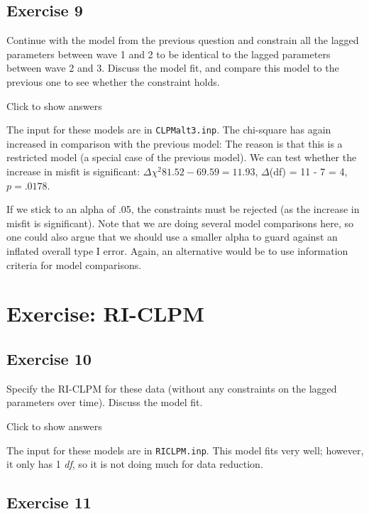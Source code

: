 \documentclass[
]{book}
\begin{document}
\hypertarget{exercise-9}{%
\subsection{Exercise 9}\label{exercise-9}}

Continue with the model from the previous question and constrain all the lagged parameters between wave 1 and 2 to be identical to the lagged parameters between wave 2 and 3. Discuss the model fit, and compare this model to the previous one to see whether the constraint holds.

Click to show answers

The input for these models are in \texttt{CLPMalt3.inp}. The chi-square has again increased in comparison with the previous model: The reason is that this is a restricted model (a special case of the previous model). We can test whether the increase in misfit is significant: \(\Delta\chi^{2} 81.52 - 69.59 = 11.93\), \(\Delta\)(df) = 11 - 7 = 4, \(p = .0178\).

If we stick to an alpha of .05, the constraints must be rejected (as the increase in misfit is significant). Note that we are doing several model comparisons here, so one could also argue that we should use a smaller alpha to guard against an inflated overall type I error. Again, an alternative would be to use information criteria for model comparisons.

\hypertarget{exercise-ri-clpm}{%
\section{Exercise: RI-CLPM}\label{exercise-ri-clpm}}

\hypertarget{exercise-10}{%
\subsection{Exercise 10}\label{exercise-10}}

Specify the RI-CLPM for these data (without any constraints on the lagged parameters over time). Discuss the model fit.

Click to show answers

The input for these models are in \texttt{RICLPM.inp}. This model fits very well; however, it only has 1 \emph{df}, so it is not doing much for data reduction.

\hypertarget{exercise-11}{%
\subsection{Exercise 11}\label{exercise-11}}
\end{document}
